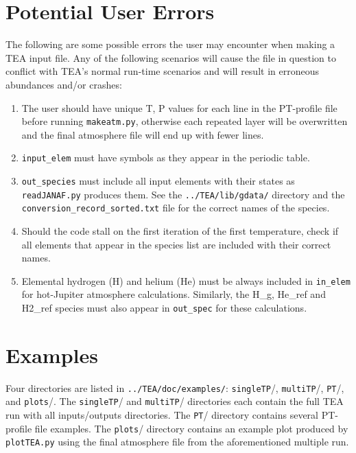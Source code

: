 {%
\section{Potential User Errors}
\label{errors}

The following are some possible errors the user may encounter when
making a TEA input file.  Any of the following scenarios will cause
the file in question to conflict with TEA's normal run-time scenarios
and will result in erroneous abundances and/or crashes:

{
\begin{enumerate}
\setlength\itemsep{0ex}
\setlength\topsep{0ex}
\setlength\partopsep{0ex}
\setlength\parsep{0ex}

   \item The user should have unique T, P values for each line in the
     PT-profile file before running \texttt{makeatm.py}, otherwise
     each repeated layer will be overwritten and the final atmosphere
     file will end up with fewer lines.  
   \item \texttt{input\_elem}
     must have symbols as they appear in the periodic
     table.  
   \item \texttt{out\_species} must include all input
     elements with their states as \texttt{readJANAF.py} produces
     them. See the \texttt{../TEA/lib/gdata/} directory and
     the \newline \texttt{conversion\_record\_sorted.txt} file for the
     correct names of the species.  
   \item Should the code stall on the
     first iteration of the first temperature, check if all elements
     that appear in the species list are included with their correct
     names.  
   \item Elemental hydrogen (H) and helium (He) must be always
     included in \texttt{in\_elem} for hot-Jupiter atmosphere
     calculations. Similarly, the H\_g, He\_ref and H2\_ref species
     must also appear in \texttt{out\_spec} for these calculations.


\end{enumerate}
}

\section{Examples}
\label{examples}
Four directories are listed in \texttt{../TEA/doc/examples/}:
\texttt{singleTP}/, \texttt{multiTP}/, \texttt{PT}/, and 
\newline \texttt{plots}/. The \texttt{singleTP}/ and \texttt{multiTP}/ 
directories each contain the full TEA run with all inputs/outputs
directories. The \texttt{PT}/ directory contains several PT-profile
file examples. The \texttt{plots}/ directory contains an example plot
produced by \texttt{plotTEA.py} using the final atmosphere file from
the aforementioned multiple  run.

}
